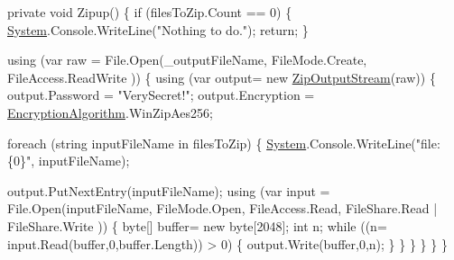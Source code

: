 \begin{DoxyCode}
\textcolor{keyword}{private} \textcolor{keywordtype}{void} Zipup()
\{
    \textcolor{keywordflow}{if} (filesToZip.Count == 0)
    \{
        \mbox{\hyperlink{namespace_system}{System}}.Console.WriteLine(\textcolor{stringliteral}{"Nothing to do."});
        \textcolor{keywordflow}{return};
    \}

    \textcolor{keyword}{using} (var raw = File.Open(\_outputFileName, FileMode.Create, FileAccess.ReadWrite ))
    \{
        \textcolor{keyword}{using} (var output= \textcolor{keyword}{new} \mbox{\hyperlink{class_super_tiled2_unity_1_1_ionic_1_1_zip_1_1_zip_output_stream_ae484108e008d5822cd7e140bcf44e9fe}{ZipOutputStream}}(raw))
        \{
            output.Password = \textcolor{stringliteral}{"VerySecret!"};
            output.Encryption = \mbox{\hyperlink{namespace_super_tiled2_unity_1_1_ionic_1_1_zip_aa3f4e8aa12ef827ac72177a49b4e28e6}{EncryptionAlgorithm}}.WinZipAes256;

            \textcolor{keywordflow}{foreach} (\textcolor{keywordtype}{string} inputFileName \textcolor{keywordflow}{in} filesToZip)
            \{
                \mbox{\hyperlink{namespace_system}{System}}.Console.WriteLine(\textcolor{stringliteral}{"file: \{0\}"}, inputFileName);

                output.PutNextEntry(inputFileName);
                \textcolor{keyword}{using} (var input = File.Open(inputFileName, FileMode.Open, FileAccess.Read, FileShare.Read 
      | FileShare.Write ))
                \{
                    byte[] buffer= \textcolor{keyword}{new} byte[2048];
                    \textcolor{keywordtype}{int} n;
                    \textcolor{keywordflow}{while} ((n= input.Read(buffer,0,buffer.Length)) > 0)
                    \{
                        output.Write(buffer,0,n);
                    \}
                \}
            \}
        \}
    \}
\}
\end{DoxyCode}



